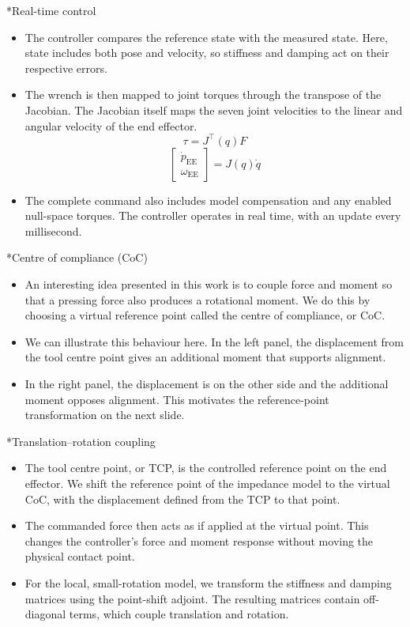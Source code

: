 \documentclass[12pt,a4paper]{article}
\makeatletter
\renewcommand\section{\@startsection{section}{1}{0pt}{14pt}{6pt}{\normalfont\Large\bfseries\color{navy}}}
\makeatother
\begin{document}
\section*{Real-time control}
\begin{itemize}
\item The controller compares the reference state with the measured state. Here, state includes both pose and velocity, so stiffness and damping act on their respective errors.
\item The wrench is then mapped to joint torques through the transpose of the Jacobian. The Jacobian itself maps the seven joint velocities to the linear and angular velocity of the end effector.
\[
\tau=J^\top(q)F
\]
\[
\begin{bmatrix}\dot p_{\mathrm{EE}}\\\omega_{\mathrm{EE}}\end{bmatrix}=J(q)\dot q
\]
\item The complete command also includes model compensation and any enabled null-space torques. The controller operates in real time, with an update every millisecond.
\end{itemize}

\section*{Centre of compliance (CoC)}
\begin{itemize}
\item An interesting idea presented in this work is to couple force and moment so that a pressing force also produces a rotational moment. We do this by choosing a virtual reference point called the centre of compliance, or CoC.
\item We can illustrate this behaviour here. In the left panel, the displacement from the tool centre point gives an additional moment that supports alignment.
\item In the right panel, the displacement is on the other side and the additional moment opposes alignment. This motivates the reference-point transformation on the next slide.
\end{itemize}

\section*{Translation--rotation coupling}
\begin{itemize}
\item The tool centre point, or TCP, is the controlled reference point on the end effector. We shift the reference point of the impedance model to the virtual CoC, with the displacement defined from the TCP to that point.
\item The commanded force then acts as if applied at the virtual point. This changes the controller's force and moment response without moving the physical contact point.
\item For the local, small-rotation model, we transform the stiffness and damping matrices using the point-shift adjoint. The resulting matrices contain off-diagonal terms, which couple translation and rotation.
\end{itemize}
\end{document}
